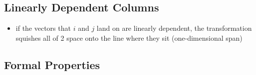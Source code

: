 \subsection{Linearly Dependent Columns}
\begin{itemize}
    \item if the vectors that $i$ and $j$ land on are linearly dependent, the transformation squishes all of 2 space onto the line where they sit (one-dimensional span) 
\end{itemize}

\subsection{Formal Properties}